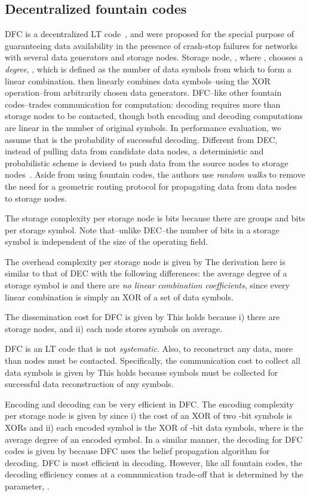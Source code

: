 \documentclass[10pt,journal,letterpaper,compsoc]{IEEEtran}
\newcommand{\0}{{\bf 0}}
\begin{document}
\subsection{Decentralized fountain codes}
DFC is a decentralized LT code~\cite{luby2002lt}, and were proposed for the special purpose of guaranteeing data availability in the presence of crash-stop failures for networks with several data generators and storage nodes. Storage node, , where , chooses a \emph{degree}, , which is defined as the number of data symbols from which to form a linear combination.  then linearly combines  data symbols--using the XOR operation--from  arbitrarily chosen
data generators. DFC--like other fountain codes--trades communication for computation: decoding requires more than  storage nodes to be contacted, though both encoding and decoding computations are linear in the number of original symbols. In performance evaluation, we assume that  is the probability of successful decoding. 
Different from DEC, instead of pulling data from candidate data  nodes, a deterministic and probabilistic scheme is devised to push data from the
source nodes to storage nodes~\cite{lin2007dpl}. Aside from using fountain codes, the authors use \emph{random walks} to remove the need for a geometric routing protocol for propagating data from data  nodes to storage nodes.

The storage complexity per storage node is
 bits because there are  groups and  bits per storage symbol. Note that--unlike DEC--the number of bits in a storage symbol is independent of the size of the operating field.

The overhead complexity per storage node is given by  The derivation here is similar to that of DEC with the following differences: the average degree of a storage symbol is  and there are \emph{no linear combination coefficients}, since every linear combination is simply an XOR of a set of data symbols. 

The dissemination cost for DFC is given by
 This holds because i) there are  storage nodes,
and ii) each node stores  symbols on average.

DFC is an LT code that is not \emph{systematic}. Also, to reconstruct any data, more than  nodes must be contacted. Specifically, the communication cost to collect all data symbols is given by
 This holds because  symbols must be collected for successful data reconstruction of any  symbols. 

Encoding and decoding can be very efficient in DFC. The encoding complexity per storage node is given by
 since i) the cost of an XOR of two -bit symbols is  XORs and
ii) each encoded symbol is the XOR of  -bit data symbols, where  is the average degree of an encoded symbol.
In a similar manner, the decoding for DFC codes is given by
 because DFC uses the  belief propagation algorithm for decoding.
DFC is most efficient in decoding. However, like all fountain codes, the decoding efficiency comes at a communication trade-off that is determined by the parameter, .
\end{document}
